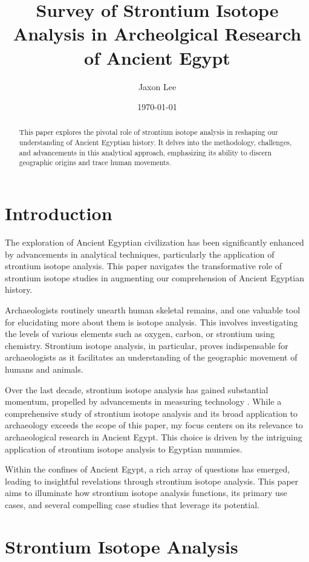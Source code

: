 \documentclass[a4paper, 12pt]{article}
\title{Survey of Strontium Isotope Analysis in Archeolgical Research of Ancient Egypt}
\author{Jaxon Lee}
\date{\today}
\begin{document}
\maketitle

\begin{abstract}
    This paper explores the pivotal role of strontium isotope analysis in reshaping our understanding of Ancient Egyptian history. It delves into the methodology, challenges, and advancements in this analytical approach, emphasizing its ability to discern geographic origins and trace human movements.
\end{abstract}

\section{Introduction}
The exploration of Ancient Egyptian civilization has been significantly enhanced by
advancements in analytical techniques, particularly the application of strontium
isotope analysis. This paper navigates the transformative role of strontium isotope
studies in augmenting our comprehension of Ancient Egyptian history.

Archaeologists routinely unearth human skeletal remains, and one valuable tool for
elucidating more about them is isotope analysis. This involves investigating the
levels of various elements such as oxygen, carbon, or strontium using chemistry.
Strontium isotope analysis, in particular, proves indispensable for archaeologists
as it facilitates an understanding of the geographic movement of humans and animals.

Over the last decade, strontium isotope analysis has gained substantial momentum,
propelled by advancements in measuring technology \citep{holt2021}. While a
comprehensive study of strontium isotope analysis and its broad application to archaeology
exceeds the scope of this paper, my focus centers on its relevance to archaeological
research in Ancient Egypt. This choice is driven by the intriguing application of
strontium isotope analysis to Egyptian mummies.

Within the confines of Ancient Egypt, a rich array of questions has emerged, leading
to insightful revelations through strontium isotope analysis. This paper aims to
illuminate how strontium isotope analysis functions, its primary use cases, and several
compelling case studies that leverage its potential.

\section{Strontium Isotope Analysis}
\end{document}

